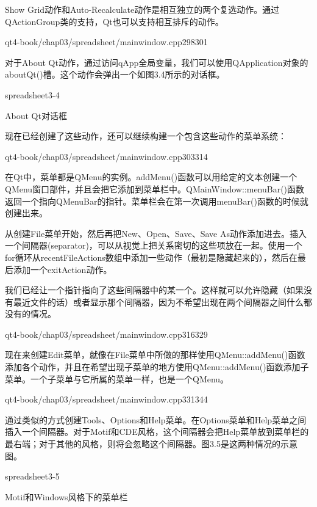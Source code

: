\documentclass[11pt,oneside]{book}
\begin{document}
\begin{common-format}
Show Grid动作和Auto-Recalculate动作是相互独立的两个复选动作。通过QActionGroup类的支持，Qt也可以支持相互排斥的动作。
\begin{cppline}{qt4-book/chap03/spreadsheet/mainwindow.cpp}{298}{301}
\end{cppline}

对于About Qt动作，通过访问qApp全局变量，我们可以使用QApplication对象的aboutQt()槽。这个动作会弹出一个如图3.4所示的对话框。
\begin{linefig}[0.8]{spreadsheet3-4}
\caption{About Qt对话框}
\label{fig:spreadsheet3-4}
\end{linefig}

现在已经创建了这些动作，还可以继续构建一个包含这些动作的菜单系统：
\begin{cppline}{qt4-book/chap03/spreadsheet/mainwindow.cpp}{303}{314}
\end{cppline}

在Qt中，菜单都是QMenu的实例。addMenu()函数可以用给定的文本创建一个QMenu窗口部件，并且会把它添加到菜单栏中。QMainWindow::menuBar()函数返回一个指向QMenuBar的指针。菜单栏会在第一次调用menuBar()函数的时候就创建出来。

从创建File菜单开始，然后再把New、Open、Save、Save As动作添加进去。插入一个间隔器(separator)，可以从视觉上把关系密切的这些项放在一起。使用一个for循环从recentFileActions数组中添加一些动作（最初是隐藏起来的），然后在最后添加一个exitAction动作。

我们已经让一个指针指向了这些间隔器中的某一个。这样就可以允许隐藏（如果没有最近文件的话）或者显示那个间隔器，因为不希望出现在两个间隔器之间什么都没有的情况。
\begin{cppline}{qt4-book/chap03/spreadsheet/mainwindow.cpp}{316}{329}
\end{cppline}

现在来创建Edit菜单，就像在File菜单中所做的那样使用QMenu::addMenu\linebreak ()函数添加各个动作，并且在希望出现子菜单的地方使用QMenu::addMenu()函数添加子菜单。一个子菜单与它所属的菜单一样，也是一个QMenu。
\begin{cppline}{qt4-book/chap03/spreadsheet/mainwindow.cpp}{331}{344}
\end{cppline}

通过类似的方式创建Tools、Options和Help菜单。在Options菜单和Help菜单之间插入一个间隔器。对于Motif和CDE风格，这个间隔器会把Help菜单放到菜单栏的最右端；对于其他的风格，则将会忽略这个间隔器。图3.5是这两种情况的示意图。

\begin{linefig}[0.8]{spreadsheet3-5}
\caption{Motif和Windows风格下的菜单栏}
\label{fig:spreadsheet3-5}
\end{linefig}


\end{common-format}
\end{document}
